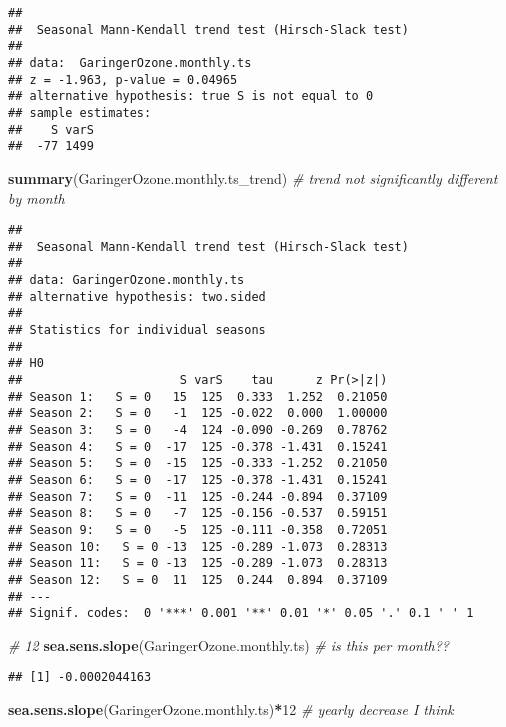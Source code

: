 \documentclass[
]{article}
\newenvironment{Shaded}{\begin{snugshade}}{\end{snugshade}}
\newcommand{\CommentTok}[1]{\textcolor[rgb]{0.56,0.35,0.01}{\textit{#1}}}
\newcommand{\DecValTok}[1]{\textcolor[rgb]{0.00,0.00,0.81}{#1}}
\newcommand{\KeywordTok}[1]{\textcolor[rgb]{0.13,0.29,0.53}{\textbf{#1}}}
\newcommand{\NormalTok}[1]{#1}
\newcommand{\OperatorTok}[1]{\textcolor[rgb]{0.81,0.36,0.00}{\textbf{#1}}}
\begin{document}
\begin{verbatim}
## 
##  Seasonal Mann-Kendall trend test (Hirsch-Slack test)
## 
## data:  GaringerOzone.monthly.ts
## z = -1.963, p-value = 0.04965
## alternative hypothesis: true S is not equal to 0
## sample estimates:
##    S varS 
##  -77 1499
\end{verbatim}

\begin{Shaded}
\begin{Highlighting}[]
\KeywordTok{summary}\NormalTok{(GaringerOzone.monthly.ts_trend) }\CommentTok{# trend not significantly different by month}
\end{Highlighting}
\end{Shaded}

\begin{verbatim}
## 
##  Seasonal Mann-Kendall trend test (Hirsch-Slack test)
## 
## data: GaringerOzone.monthly.ts
## alternative hypothesis: two.sided
## 
## Statistics for individual seasons
## 
## H0
##                      S varS    tau      z Pr(>|z|)  
## Season 1:   S = 0   15  125  0.333  1.252  0.21050  
## Season 2:   S = 0   -1  125 -0.022  0.000  1.00000  
## Season 3:   S = 0   -4  124 -0.090 -0.269  0.78762  
## Season 4:   S = 0  -17  125 -0.378 -1.431  0.15241  
## Season 5:   S = 0  -15  125 -0.333 -1.252  0.21050  
## Season 6:   S = 0  -17  125 -0.378 -1.431  0.15241  
## Season 7:   S = 0  -11  125 -0.244 -0.894  0.37109  
## Season 8:   S = 0   -7  125 -0.156 -0.537  0.59151  
## Season 9:   S = 0   -5  125 -0.111 -0.358  0.72051  
## Season 10:   S = 0 -13  125 -0.289 -1.073  0.28313  
## Season 11:   S = 0 -13  125 -0.289 -1.073  0.28313  
## Season 12:   S = 0  11  125  0.244  0.894  0.37109  
## ---
## Signif. codes:  0 '***' 0.001 '**' 0.01 '*' 0.05 '.' 0.1 ' ' 1
\end{verbatim}

\begin{Shaded}
\begin{Highlighting}[]
\CommentTok{# 12}
\KeywordTok{sea.sens.slope}\NormalTok{(GaringerOzone.monthly.ts) }\CommentTok{# is this per month??}
\end{Highlighting}
\end{Shaded}

\begin{verbatim}
## [1] -0.0002044163
\end{verbatim}

\begin{Shaded}
\begin{Highlighting}[]
\KeywordTok{sea.sens.slope}\NormalTok{(GaringerOzone.monthly.ts)}\OperatorTok{*}\DecValTok{12}  \CommentTok{# yearly decrease I think}
\end{Highlighting}
\end{Shaded}
\end{document}
